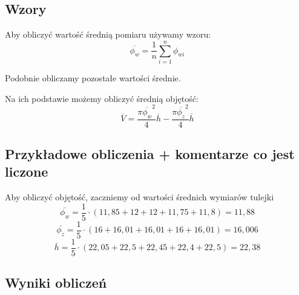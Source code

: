 \documentclass{article}
\begin{document}
\subsection{Wzory}
Aby obliczyć wartość średnią pomiaru używamy wzoru:
\begin{equation*}
    \overline{\phi_w} = \frac{1}{n}\sum_{i=1}^n \phi_{wi}
\end{equation*}

Podobnie obliczamy pozostałe wartości średnie.

Na ich podstawie możemy obliczyć średnią objętość:
\begin{equation*}
    \overline{V} = \frac{\pi\overline{\phi_w}^2}{4}\overline{h} - \frac{\pi\overline{\phi_z}^2}{4}\overline{h}
\end{equation*}

\subsection{Przykładowe obliczenia + komentarze co jest liczone}

Aby obliczyć objętość, zaczniemy od wartości średnich wymiarów tulejki
\begin{equation*}
    \overline{\phi_w} = \frac{1}{5} \cdot (11,85 + 12 + 12 + 11,75 + 11,8) = 11,88
\end{equation*}
\begin{equation*}
    \overline{\phi_z} = \frac{1}{5} \cdot (16 + 16,01 + 16,01 + 16 + 16,01) = 16,006
\end{equation*}
\begin{equation*}
    \overline{h} = \frac{1}{5} \cdot (22,05 + 22,5 + 22,45 + 22,4 + 22,5) = 
     22,38
\end{equation*}

\subsection{Wyniki obliczeń}
\end{document}

